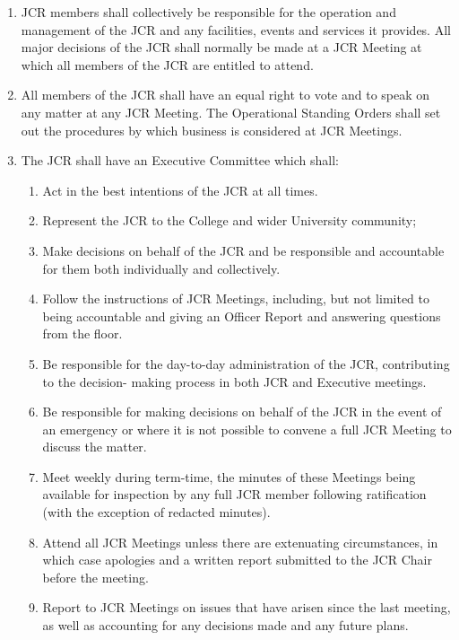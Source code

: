 \begin{enumerate}
    \item JCR members shall collectively be responsible for the operation and management of the JCR and any facilities, events and services it provides. All major decisions of the JCR shall normally be made at a JCR Meeting at which all members of the JCR are entitled to attend.
    \item All members of the JCR shall have an equal right to vote and to speak on any matter at any JCR Meeting. The Operational Standing Orders shall set out the procedures by which business is considered at JCR Meetings.
    \item The JCR shall have an Executive Committee which shall:
        \begin{enumerate}
            \item Act in the best intentions of the JCR at all times.
            \item Represent the JCR to the College and wider University community;
            \item Make decisions on behalf of the JCR and be responsible and accountable for them both individually and collectively.
            \item Follow the instructions of JCR Meetings, including, but not limited to being accountable and giving an Officer Report and answering questions from the floor.
            \item Be responsible for the day-to-day administration of the JCR, contributing to the decision- making process in both JCR and Executive meetings.
            \item Be responsible for making decisions on behalf of the JCR in the event of an emergency or where it is not possible to convene a full JCR Meeting to discuss the matter.
            \item Meet weekly during term-time, the minutes of these Meetings being available for inspection by any full JCR member following ratification (with the exception of redacted minutes).
            \item Attend all JCR Meetings unless there are extenuating circumstances, in which case apologies and a written report submitted to the JCR Chair before the meeting.
            \item Report to JCR Meetings on issues that have arisen since the last meeting, as well as accounting for any decisions made and any future plans.

\end{enumerate}
\end{enumerate}

